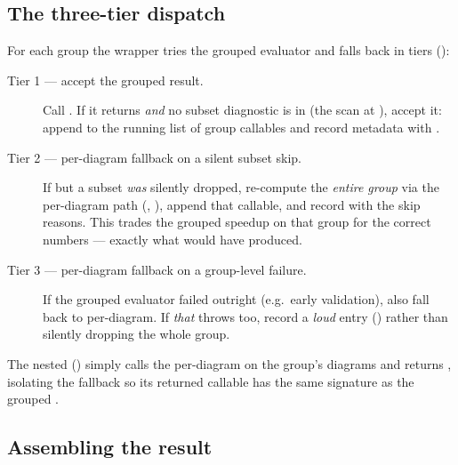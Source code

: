 \subsection{The three-tier dispatch}

For each group the wrapper tries the grouped evaluator and falls back in tiers
():

\begin{description}
  \item[Tier 1 --- accept the grouped result.] Call
        . If it returns 
        \emph{and} no subset diagnostic is in 
        (the  scan at
        ), accept it: append
         to the running list of group callables and
        record metadata with .
  \item[Tier 2 --- per-diagram fallback on a silent subset skip.] If
         but a subset \emph{was} silently dropped, re-compute
        the \emph{entire group} via the per-diagram path
        (, ), append
        that callable, and record  with
        the skip reasons. This trades the grouped speedup on that group for the
        correct numbers --- exactly what  would
        have produced.
  \item[Tier 3 --- per-diagram fallback on a group-level failure.] If the grouped
        evaluator failed outright (e.g.\ early validation), also fall back to
        per-diagram. If \emph{that} throws too, record a \emph{loud}
         entry () rather than
        silently dropping the whole group.
\end{description}

The nested  ()
simply calls the per-diagram  on the group's diagrams
and returns , isolating the fallback so its
returned callable has the same  signature as
the grouped .

\subsection{Assembling the result}

